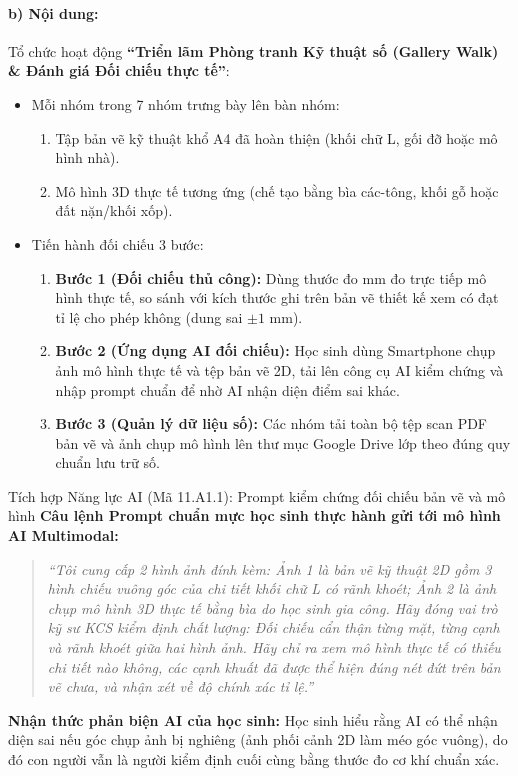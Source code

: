 \documentclass[12pt, a4paper]{article}
\begin{document}
\paragraph{b) Nội dung:} Tổ chức hoạt động \textbf{``Triển lãm Phòng tranh Kỹ thuật số (Gallery Walk) \& Đánh giá Đối chiếu thực tế''}:
\begin{itemize}[leftmargin=0.6cm]
    \item Mỗi nhóm trong 7 nhóm trưng bày lên bàn nhóm:
    \begin{enumerate}[leftmargin=0.5cm]
        \item Tập bản vẽ kỹ thuật khổ A4 đã hoàn thiện (khối chữ L, gối đỡ hoặc mô hình nhà).
        \item Mô hình 3D thực tế tương ứng (chế tạo bằng bìa các-tông, khối gỗ hoặc đất nặn/khối xốp).
    \end{enumerate}
    \item Tiến hành đối chiếu 3 bước:
    \begin{enumerate}[leftmargin=0.5cm]
        \item \textbf{Bước 1 (Đối chiếu thủ công):} Dùng thước đo mm đo trực tiếp mô hình thực tế, so sánh với kích thước ghi trên bản vẽ thiết kế xem có đạt tỉ lệ cho phép không (dung sai $\pm 1\text{ mm}$).
        \item \textbf{Bước 2 (Ứng dụng AI đối chiếu):} Học sinh dùng Smartphone chụp ảnh mô hình thực tế và tệp bản vẽ 2D, tải lên công cụ AI kiểm chứng và nhập prompt chuẩn để nhờ AI nhận diện điểm sai khác.
        \item \textbf{Bước 3 (Quản lý dữ liệu số):} Các nhóm tải toàn bộ tệp scan PDF bản vẽ và ảnh chụp mô hình lên thư mục Google Drive lớp theo đúng quy chuẩn lưu trữ số.
    \end{enumerate}
\end{itemize}

\begin{aibox}{Tích hợp Năng lực AI (Mã 11.A1.1): Prompt kiểm chứng đối chiếu bản vẽ và mô hình}
\textbf{Câu lệnh Prompt chuẩn mực học sinh thực hành gửi tới mô hình AI Multimodal:}
\begin{quote}
\textit{``Tôi cung cấp 2 hình ảnh đính kèm: Ảnh 1 là bản vẽ kỹ thuật 2D gồm 3 hình chiếu vuông góc của chi tiết khối chữ L có rãnh khoét; Ảnh 2 là ảnh chụp mô hình 3D thực tế bằng bìa do học sinh gia công. Hãy đóng vai trò kỹ sư KCS kiểm định chất lượng: Đối chiếu cẩn thận từng mặt, từng cạnh và rãnh khoét giữa hai hình ảnh. Hãy chỉ ra xem mô hình thực tế có thiếu chi tiết nào không, các cạnh khuất đã được thể hiện đúng nét đứt trên bản vẽ chưa, và nhận xét về độ chính xác tỉ lệ.''}
\end{quote}
\textbf{Nhận thức phản biện AI của học sinh:} Học sinh hiểu rằng AI có thể nhận diện sai nếu góc chụp ảnh bị nghiêng (ảnh phối cảnh 2D làm méo góc vuông), do đó con người vẫn là người kiểm định cuối cùng bằng thước đo cơ khí chuẩn xác.
\end{aibox}
\end{document}
